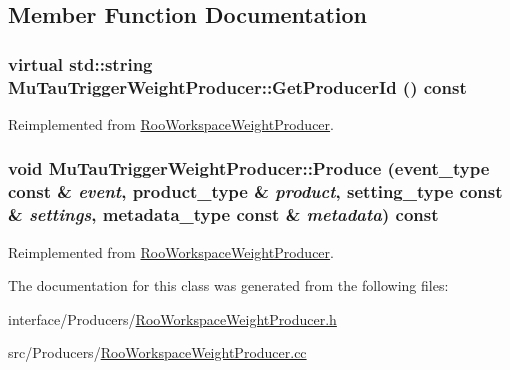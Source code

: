 \subsection{Member Function Documentation}
\hypertarget{classMuTauTriggerWeightProducer_ac7ed3993ecc2ad90b439b9aa9d478724}{
\subsubsection[{GetProducerId}]{\setlength{\rightskip}{0pt plus 5cm}virtual std::string MuTauTriggerWeightProducer::GetProducerId () const}}
\label{classMuTauTriggerWeightProducer_ac7ed3993ecc2ad90b439b9aa9d478724}


Reimplemented from \hyperlink{classRooWorkspaceWeightProducer_a40f7cc577a5dbf0504fc9f3c1670a0a2}{RooWorkspaceWeightProducer}.\hypertarget{classMuTauTriggerWeightProducer_a0401bf07b21eab934e0f9417b2316c5a}{
\subsubsection[{Produce}]{\setlength{\rightskip}{0pt plus 5cm}void MuTauTriggerWeightProducer::Produce (event\_\-type const \& {\em event}, \/  product\_\-type \& {\em product}, \/  setting\_\-type const \& {\em settings}, \/  metadata\_\-type const \& {\em metadata}) const}}
\label{classMuTauTriggerWeightProducer_a0401bf07b21eab934e0f9417b2316c5a}


Reimplemented from \hyperlink{classRooWorkspaceWeightProducer_afd139b8380a91e8aaa72066a8a826350}{RooWorkspaceWeightProducer}.

The documentation for this class was generated from the following files:\begin{DoxyCompactItemize}
\item 
interface/Producers/\hyperlink{RooWorkspaceWeightProducer_8h}{RooWorkspaceWeightProducer.h}\item 
src/Producers/\hyperlink{RooWorkspaceWeightProducer_8cc}{RooWorkspaceWeightProducer.cc}\end{DoxyCompactItemize}
